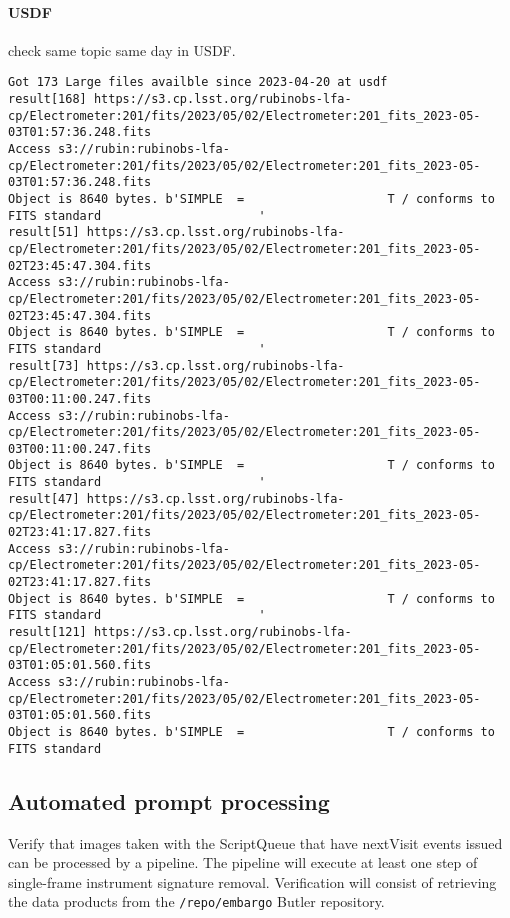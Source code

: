 \paragraph{USDF} check same topic same day in USDF.
\begin{lstlisting}
Got 173 Large files availble since 2023-04-20 at usdf
result[168] https://s3.cp.lsst.org/rubinobs-lfa-cp/Electrometer:201/fits/2023/05/02/Electrometer:201_fits_2023-05-03T01:57:36.248.fits
Access s3://rubin:rubinobs-lfa-cp/Electrometer:201/fits/2023/05/02/Electrometer:201_fits_2023-05-03T01:57:36.248.fits
Object is 8640 bytes. b'SIMPLE  =                    T / conforms to FITS standard                      '
result[51] https://s3.cp.lsst.org/rubinobs-lfa-cp/Electrometer:201/fits/2023/05/02/Electrometer:201_fits_2023-05-02T23:45:47.304.fits
Access s3://rubin:rubinobs-lfa-cp/Electrometer:201/fits/2023/05/02/Electrometer:201_fits_2023-05-02T23:45:47.304.fits
Object is 8640 bytes. b'SIMPLE  =                    T / conforms to FITS standard                      '
result[73] https://s3.cp.lsst.org/rubinobs-lfa-cp/Electrometer:201/fits/2023/05/02/Electrometer:201_fits_2023-05-03T00:11:00.247.fits
Access s3://rubin:rubinobs-lfa-cp/Electrometer:201/fits/2023/05/02/Electrometer:201_fits_2023-05-03T00:11:00.247.fits
Object is 8640 bytes. b'SIMPLE  =                    T / conforms to FITS standard                      '
result[47] https://s3.cp.lsst.org/rubinobs-lfa-cp/Electrometer:201/fits/2023/05/02/Electrometer:201_fits_2023-05-02T23:41:17.827.fits
Access s3://rubin:rubinobs-lfa-cp/Electrometer:201/fits/2023/05/02/Electrometer:201_fits_2023-05-02T23:41:17.827.fits
Object is 8640 bytes. b'SIMPLE  =                    T / conforms to FITS standard                      '
result[121] https://s3.cp.lsst.org/rubinobs-lfa-cp/Electrometer:201/fits/2023/05/02/Electrometer:201_fits_2023-05-03T01:05:01.560.fits
Access s3://rubin:rubinobs-lfa-cp/Electrometer:201/fits/2023/05/02/Electrometer:201_fits_2023-05-03T01:05:01.560.fits
Object is 8640 bytes. b'SIMPLE  =                    T / conforms to FITS standard
\end{lstlisting}

\subsection{Automated prompt processing}
Verify that images taken with the ScriptQueue that have nextVisit events issued can be processed by a pipeline.
The pipeline will execute at least one step of single-frame instrument signature removal.
Verification will consist of retrieving the data products from the \texttt{/repo/embargo} Butler repository.

